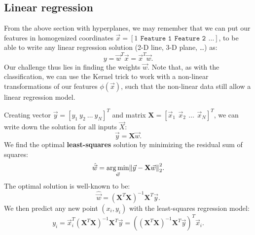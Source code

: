 \documentclass{article}
\DeclarePairedDelimiter\norm{\lVert}{\rVert}%
\DeclareMathOperator*{\argmin}{arg\,min}
\begin{document}
\subsection{Linear regression}
From the above section with hyperplanes, we may remember that we can put our features in homogenized coordinates $\vec{x}=[1\ \,\texttt{Feature 1}\ \,\texttt{Feature 2}\ \,\dots]$, to be able to write any linear regression solution (2-D line, 3-D plane, \dots) as:
\begin{equation}
    y = \vec{w}^T\vec{x}=\vec{x}^T\vec{w}.
\end{equation}
Our challenge thus lies in finding the weights $\vec{w}$. Note that, as with the classification, we can use the Kernel trick to work with a non-linear transformations of our features $\phi(\vec{x})$, such that the non-linear data still allow a linear regression model.
\begin{spexample}
    Creating vector $\vec{y}=[y_1\ y_2\ \dots\ y_N]^T$ and matrix $\mathbf{X}=[\vec{x}_1\ \, \vec{x}_2\ \,\dots\  \,\vec{x}_N]^T$, we can write down the solution for all inputs $\vec{X}$:
    \begin{equation}
        \vec{y} = \mathbf{X}\vec{w}.
    \end{equation}
    We find the optimal \textbf{least-squares} solution by minimizing the residual sum of squares:
    \begin{equation}
        \hat{\vec{w}} = \argmin_{\vec{w}} \norm*{\vec{y}-\mathbf{X}\vec{w}}^2_2.
    \end{equation}
    The optimal solution is well-known to be:
    \begin{equation}
        \hat{\vec{w}} = (\mathbf{X}^{T}\mathbf{X})^{-1} \mathbf{X}^{T}\vec{y}.
    \end{equation}
    We then predict any new point $(x_i,y_i)$ with the least-squares regression model:
    \begin{equation}
        y_i = \vec{x}_i^T (\mathbf{X}^{T}\mathbf{X})^{-1} \mathbf{X}^{T}\vec{y} =  \left((\mathbf{X}^{T}\mathbf{X})^{-1} \mathbf{X}^{T}\vec{y}\right)^T\vec{x}_i.
    \end{equation}
\end{spexample}
\end{document}
